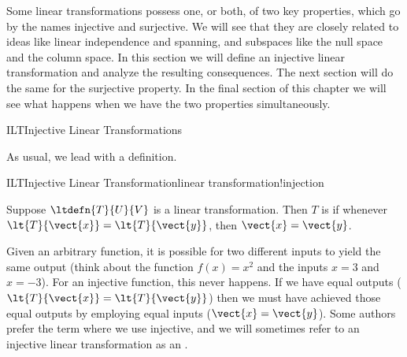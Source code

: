 %
\begin{introduction}
\begin{para}Some linear transformations possess one, or both, of two key properties, which go by the names injective and surjective.  We will see that they are closely related to ideas like linear independence and spanning, and subspaces like the null space and the column space.  In this section we will define an injective linear transformation and analyze the resulting consequences.  The next section will do the same for the surjective property.  In the final section of this chapter we will see what happens when we have the two properties simultaneously.\end{para}
\end{introduction}
%
\begin{subsect}{ILT}{Injective Linear Transformations}
%
\begin{para}As usual, we lead with a definition.\end{para}
%
\begin{definition}{ILT}{Injective Linear Transformation}{linear transformation!injection}
\begin{para}Suppose $\ltdefn{T}{U}{V}$ is a linear transformation.  Then $T$ is  if whenever $\lt{T}{\vect{x}}=\lt{T}{\vect{y}}$, then $\vect{x}=\vect{y}$.\end{para}
\end{definition}
%
\begin{para}Given an arbitrary function, it is possible for two different inputs to yield the same output (think about the function $f(x)=x^2$ and the inputs $x=3$ and $x=-3$).  For an injective function, this never happens.  If we have equal outputs ($\lt{T}{\vect{x}}=\lt{T}{\vect{y}}$) then we must have achieved those equal outputs by employing equal inputs ($\vect{x}=\vect{y}$).  Some authors prefer the term  where we use injective, and we will sometimes refer to an injective linear transformation as an .\end{para}
%
\end{subsect}
%
